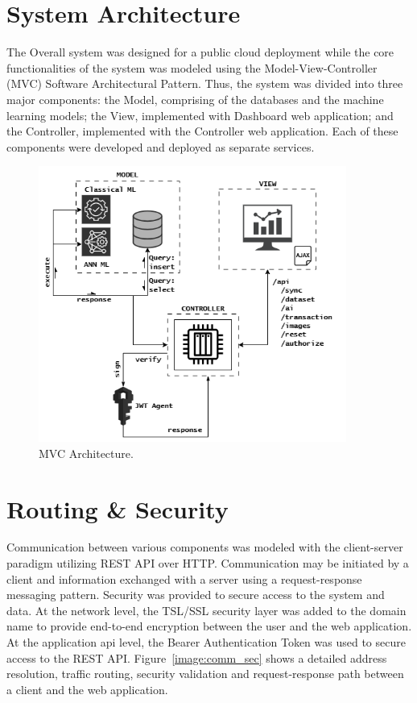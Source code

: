 \section{System Architecture}

The Overall system was designed for a public cloud deployment while the core functionalities of the system was modeled using the
Model-View-Controller (MVC) Software Architectural Pattern. Thus, the system was divided into three major components: the Model, comprising 
of the databases and the machine learning models; the View, implemented with Dashboard web application; and the Controller, implemented with 
the Controller web application. Each of these components were developed and deployed as separate services. 

\begin{figure}[h!]
    \includegraphics[width=0.9\textwidth]{images/mvc_arch.png}
    \caption{MVC Architecture.}
    \label{image:mvc_arch}
\end{figure}

\section{Routing \& Security}
Communication between various components was modeled with the client-server paradigm utilizing REST API over HTTP. Communication may be initiated
by a client and information exchanged with a server using a request-response messaging pattern.  
Security was provided to secure access to the system and data. At the network level, the TSL/SSL security layer was added to the domain name to 
provide end-to-end encryption between the user and the web application. At the application api level, the Bearer Authentication Token was used to 
secure access to the REST API. Figure~\ref{image:comm_sec} shows a detailed address resolution, traffic routing, security validation and 
request-response path between a client and the web application. 


